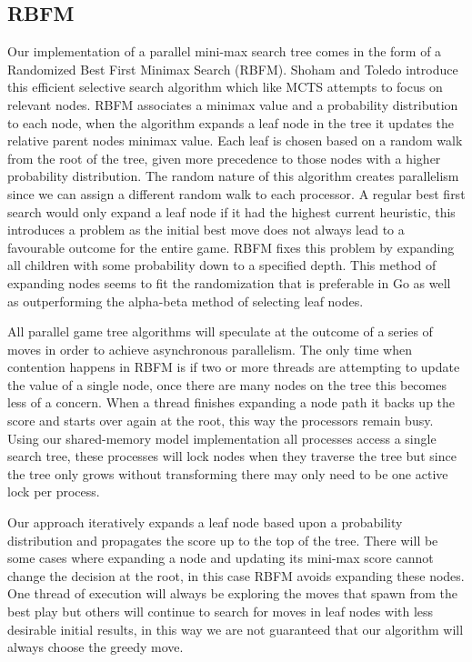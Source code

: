 \documentclass[conference]{IEEEtran}
\begin{document}
\subsection{RBFM}
Our implementation of a parallel mini-max search tree comes in the form of a Randomized Best First Minimax Search (RBFM). Shoham and Toledo introduce this efficient selective search algorithm which like MCTS attempts to focus on relevant nodes. RBFM associates a minimax value and a probability distribution to each node, when the algorithm expands a leaf node in the tree it updates the relative parent nodes minimax value. Each leaf is chosen based on a random walk from the root of the tree, given more precedence to those nodes with a higher probability distribution. The random nature of this algorithm creates parallelism since we can assign a different random walk to each processor. A regular best first search would only expand a leaf node if it had the highest current heuristic, this introduces a problem as the initial best move does not always lead to a favourable outcome for the entire game. RBFM fixes this problem by expanding all children with some probability down to a specified depth.  This method of expanding nodes seems to fit the randomization that is preferable in Go as well as outperforming the alpha-beta method of selecting leaf nodes.\par
All parallel game tree algorithms will speculate at the outcome of a series of moves in order to achieve asynchronous parallelism. The only time when contention happens in RBFM is if two or more threads are attempting to update the value of a single node, once there are many nodes on the tree this becomes less of a concern. When a thread finishes expanding a node path it backs up the score and starts over again at the root, this way the processors remain busy. Using our shared-memory model implementation all processes access a single search tree, these processes will lock nodes when they traverse the tree but since the tree only grows without transforming there may only need to be one active lock per process.\par
Our approach iteratively expands a leaf node based upon a probability distribution and propagates the score up to the top of the tree. There will be some cases where expanding a node and updating its mini-max score cannot change the decision at the root, in this case RBFM avoids expanding these nodes. One thread of execution will always be exploring the moves that spawn from the best play but others will continue to search for moves in leaf nodes with less desirable initial results, in this way we are not guaranteed that our algorithm will always choose the greedy move.
\end{document}
